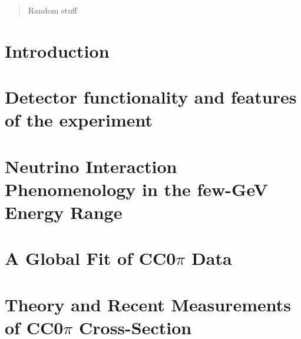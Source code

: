 \documentclass[11pt]{article}
\begin{document}
\vspace{6mm}
\begin{abstract}
    Random stuff
\end{abstract}
\newpage
\section{Introduction}
\label{sec:intro}



\section{Detector functionality and features of the experiment}
\label{sec:LArTPC}



\section{Neutrino Interaction Phenomenology in the few-GeV Energy Range}
\label{sec:NIP}



\section{A Global Fit of CC0\( \pi \) Data}
\label{sec:GF}



\section{Theory and Recent Measurements of CC0\( \pi \) Cross-Section}
\label{sec:XSec}
\end{document}
